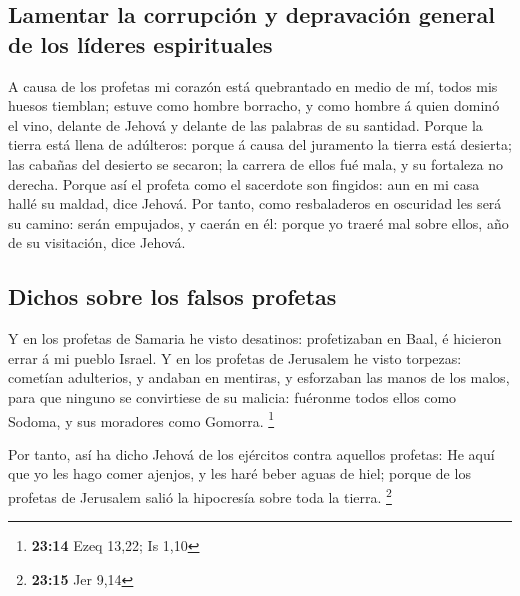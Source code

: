 \hypertarget{lamentar-la-corrupciuxf3n-y-depravaciuxf3n-general-de-los-luxedderes-espirituales}{%
\subsection{Lamentar la corrupción y depravación general de los líderes
espirituales}\label{lamentar-la-corrupciuxf3n-y-depravaciuxf3n-general-de-los-luxedderes-espirituales}}

 A causa de los profetas mi corazón está quebrantado en
medio de mí, todos mis huesos tiemblan; estuve como hombre borracho, y
como hombre á quien dominó el vino, delante de Jehová y delante de las
palabras de su santidad.  Porque la tierra está llena de
adúlteros: porque á causa del juramento la tierra está desierta; las
cabañas del desierto se secaron; la carrera de ellos fué mala, y su
fortaleza no derecha.  Porque así el profeta como el
sacerdote son fingidos: aun en mi casa hallé su maldad, dice Jehová.
 Por tanto, como resbaladeros en oscuridad les será su
camino: serán empujados, y caerán en él: porque yo traeré mal sobre
ellos, año de su visitación, dice Jehová.

\hypertarget{dichos-sobre-los-falsos-profetas}{%
\subsection{Dichos sobre los falsos
profetas}\label{dichos-sobre-los-falsos-profetas}}

 Y en los profetas de Samaria he visto desatinos:
profetizaban en Baal, é hicieron errar á mi pueblo Israel. 
Y en los profetas de Jerusalem he visto torpezas: cometían adulterios, y
andaban en mentiras, y esforzaban las manos de los malos, para que
ninguno se convirtiese de su malicia: fuéronme todos ellos como Sodoma,
y sus moradores como Gomorra. \footnote{\textbf{23:14} Ezeq 13,22; Is
  1,10}

 Por tanto, así ha dicho Jehová de los ejércitos contra
aquellos profetas: He aquí que yo les hago comer ajenjos, y les haré
beber aguas de hiel; porque de los profetas de Jerusalem salió la
hipocresía sobre toda la tierra. \footnote{\textbf{23:15} Jer 9,14}

